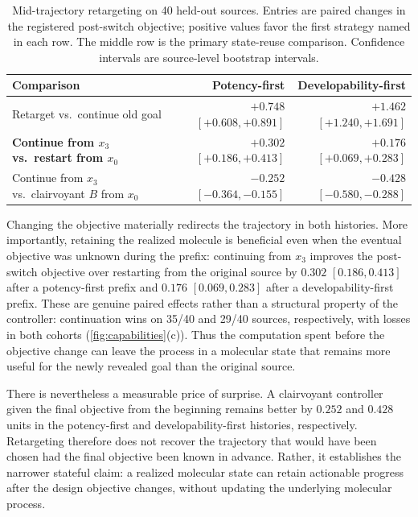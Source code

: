 \begin{table}[!ht]
\centering
{\small
\begin{tabular}{lrr}
\toprule
Comparison & Potency-first & Developability-first \\
\midrule
Retarget vs.\ continue old goal & \textbf{$+0.748$} $[+0.608,+0.891]$ & \textbf{$+1.462$} $[+1.240,+1.691]$ \\
\textbf{Continue from $x_3$ vs.\ restart from $x_0$} & \textbf{$+0.302$} $[+0.186,+0.413]$ & \textbf{$+0.176$} $[+0.069,+0.283]$ \\
Continue from $x_3$ vs.\ clairvoyant $B$ from $x_0$ & \textbf{$-0.252$} $[-0.364,-0.155]$ & \textbf{$-0.428$} $[-0.580,-0.288]$ \\
\bottomrule
\end{tabular}}
\caption{\small Mid-trajectory retargeting on 40 held-out sources. Entries are paired changes in the registered post-switch objective; positive values favor the first strategy named in each row. The middle row is the primary state-reuse comparison. Confidence intervals are source-level bootstrap intervals.}
\label{tab:retarget}
\end{table}

Changing the objective materially redirects the trajectory in both histories. More importantly, retaining the realized molecule is beneficial even when the eventual objective was unknown during the prefix: continuing from $x_3$ improves the post-switch objective over restarting from the original source by $0.302$ $[0.186,0.413]$ after a potency-first prefix and $0.176$ $[0.069,0.283]$ after a developability-first prefix. These are genuine paired effects rather than a structural property of the controller: continuation wins on 35/40 and 29/40 sources, respectively, with losses in both cohorts (\cref{fig:capabilities}(c)). Thus the computation spent before the objective change can leave the process in a molecular state that remains more useful for the newly revealed goal than the original source.

There is nevertheless a measurable price of surprise. A clairvoyant controller given the final objective from the beginning remains better by $0.252$ and $0.428$ units in the potency-first and developability-first histories, respectively. Retargeting therefore does not recover the trajectory that would have been chosen had the final objective been known in advance. Rather, it establishes the narrower stateful claim: a realized molecular state can retain actionable progress after the design objective changes, without updating the underlying molecular process.


